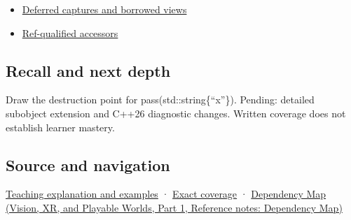 \hypertarget{appendix-a978b29bbbb0-used-by}{}

\begin{itemize}
\tightlist
\item
  \hyperref[appendix-aea529eb5175]{Deferred captures and borrowed views}
\item
  \hyperref[appendix-d42039b1d6f7]{Ref-qualified accessors}
\end{itemize}

\subsection{Recall and next depth}\label{appendix-a978b29bbbb0-recall-and-next-depth}

\hypertarget{appendix-a978b29bbbb0-recall-and-next-depth}{}

Draw the destruction point for pass(std::string\{``x''\}). Pending: detailed subobject extension and C++26 diagnostic changes. Written coverage does not establish learner mastery.

\subsection{Source and navigation}\label{appendix-a978b29bbbb0-source-and-navigation}

\hypertarget{appendix-a978b29bbbb0-source-and-navigation}{}

\hyperref[01-foundations-i-ch003-a-temporary-needs-an-explicit-lifetime-story]{Teaching explanation and examples} · \hyperref[appendix-fd090d982a15-m008---parts-113-126]{Exact coverage} · \href{../07-Vision-XR-and-Playable-Worlds-P01/main.pdf\#nameddest=appendix-4ad47bdd269a}{Dependency Map (Vision, XR, and Playable Worlds, Part 1, Reference notes: Dependency Map)}
